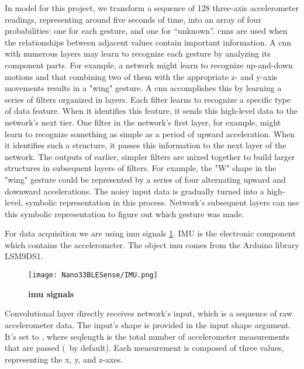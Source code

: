 In  model for this project,  we transform a sequence of 128 three-axis accelerometer readings, representing
around five seconds of time, into an array of four probabilities: one for each gesture,
and one for ``unknown''.  
\ac{cnn}s are used when the relationships between adjacent values contain important information\cite{Warden:2020}. 
A \ac{cnn} with numerous layers may learn to recognize each gesture by analyzing its component parts. For example, a network might learn to recognize up-and-down motions and that combining two of them with the appropriate z- and y-axis movements results in a "wing" gesture\cite{Warden:2020}.
A \ac{cnn} accomplishes this by learning a series of filters organized in layers. Each filter learns to recognize a specific type of data feature. When it identifies this feature, it sends this high-level data to the network's next tier. One filter in the network's first layer, for example, might learn to recognize something as simple as a period of upward acceleration. When it identifies such a structure, it passes this information to the next layer of the network.\cite{Warden:2020}
The outputs of earlier, simpler filters are mixed together to build larger structures in subsequent layers of filters. For example, the "W" shape in the "wing" gesture could be represented by a series of four alternating upward and downward accelerations.
The noisy input data is gradually turned into a high-level, symbolic representation in this process. Network's subsequent layers can use this symbolic representation to figure out which gesture was made. \cite{Warden:2020}

For data acquisition we are using \ac{imu} signals \ref{fig:IMU}. IMU is the electronic component which contains the accelerometer. The object \ac{imu} comes from the Arduino  library LSM9DS1.

\begin{figure}[h!]
    \begin{center}
        \texttt{[image: Nano33BLESense/IMU.png]}
        \caption{\textbf{\ac{imu} signals \cite{Xu:2022} }}
        \label{fig:IMU}
    \end{center}
\end{figure}

Convolutional layer directly receives network's input, which is a sequence of raw accelerometer data. The input's shape is provided in the input shape argument. It's set to , where seqlength is the total number of accelerometer measurements that are passed (\ by default). Each measurement is composed of three values, representing the x, y, and z-axes. \cite{Warden:2020}

